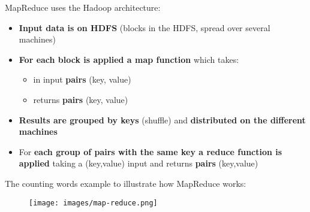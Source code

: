 \documentclass{beamer}[10pt, usepdftitle=false handout]
\begin{document}
\begin{frame}

MapReduce uses the Hadoop architecture:
\vspace*{0.6em}

\begin{itemize}
\item{\textbf{Input data is on HDFS} (blocks in the HDFS, spread over several machines)}
\item{\textbf{For each block is applied a map function} which takes:
	\begin{itemize}
		\item{in input \textbf{pairs} (key, value)}
		\item{returns \textbf{pairs} (key, value)}
	\end{itemize}}
\item{\textbf{Results are grouped by keys} (shuffle) and \textbf{distributed on the different machines}}
\item{For \textbf{each group of pairs with the same key a reduce function is applied} taking a (key,value) input and returns \textbf{pairs} (key,value)}
\end{itemize}


\end{frame}

\begin{frame}

The counting words example to illustrate how MapReduce works:
\vspace*{1.6em}

\begin{figure}
\texttt{[image: images/map-reduce.png]} 
\end{figure}	

\end{frame}
\end{document}
